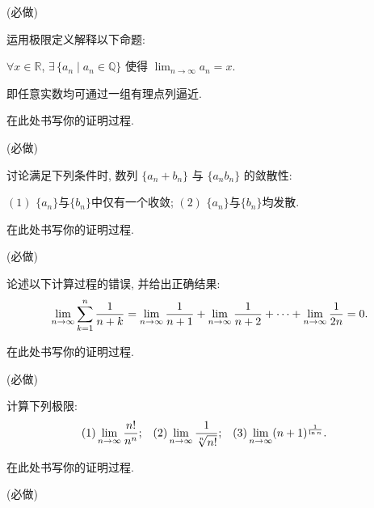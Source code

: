 \documentclass[answers, 10pt]{exam}
\begin{document}
\begin{questions}
	
	 (必做)
	
	运用极限定义解释以下命题:
	\begin{center}
		$\forall x\in\mathbb{R}$, $\exists\,\{a_n\mid a_n\in\mathbb{Q}\}$ 使得 $\displaystyle\lim_{n\to\infty} a_n = x$.
	\end{center}
	即任意实数均可通过一组有理点列逼近.
	
	\begin{solution}
		在此处书写你的证明过程.
	\end{solution}
	
	 (必做)
	
	讨论满足下列条件时, 数列 $\{a_n+b_n\}$ 与 $\{a_nb_n\}$ 的敛散性:
	\begin{center}
		$(1)$ $\{a_n\}$与$\{b_n\}$中仅有一个收敛; \qquad $(2)$ $\{a_n\}$与$\{b_n\}$均发散.
	\end{center}
	
	\begin{solution}
		在此处书写你的证明过程.
	\end{solution}
	
	 (必做)
	
	论述以下计算过程的错误, 并给出正确结果:
	$$
	\begin{aligned}
		\lim_{n\to\infty}\sum_{k=1}^{n} \frac1{n+k} = \lim_{n\to\infty} \frac1{n+1} + \lim_{n\to\infty} \frac1{n+2} + \cdots + \lim_{n\to\infty} \frac1{2n} = 0.
	\end{aligned} \vspace{-5ex}
	$$
	\begin{solution}
		在此处书写你的证明过程.
	\end{solution}
	
	 (必做)
	
	计算下列极限: 
	$$
	\begin{aligned}
		& (1) \lim_{n\to\infty} \frac{n!}{n^n};
		&&(2) \lim_{n\to\infty} \frac1{\sqrt[n]{n!}};
		&&(3) \lim_{n\to\infty} (n+1)^{\frac1{\ln n}}.
	\end{aligned} \vspace{-5ex}
	$$
	\begin{solution}
		在此处书写你的证明过程.
	\end{solution}
	
	 (必做)
	

\end{questions}
\end{document}
